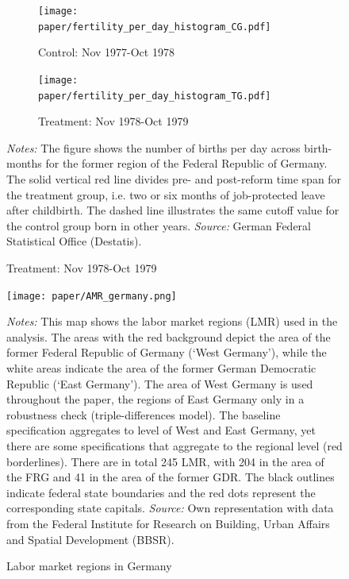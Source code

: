 \documentclass[11pt, a4paper, draft]{article} %
\begin{document}
\begin{landscape}
	\vspace*{\fill}
	\begin{figure}
		[H]\centering
		\caption{Fertility distribution for different years}\label{fig: fertility_hist}
		\begin{subfigure}[h]{0.40\linewidth}\centering
			\caption{Control: Nov 1977-Oct 1978}
			\texttt{[image: paper/fertility\_per\_day\_histogram\_CG.pdf]}
		\end{subfigure}
		\begin{subfigure}[h]{0.40\linewidth}\centering
			\caption{Treatment: Nov 1978-Oct 1979}
			\texttt{[image: paper/fertility\_per\_day\_histogram\_TG.pdf]}
		\end{subfigure}
		\scriptsize
		\begin{minipage}{0.95\linewidth}
			\emph{Notes:} The figure shows the number of births per day across birth-months for the former region of the Federal Republic of Germany. The solid vertical red line divides pre- and post-reform time span for the treatment group, i.e. two or six months of job-protected leave after childbirth. The dashed line illustrates the same cutoff value for the control group born in other years.\newline
			\emph{Source:} German Federal Statistical Office (Destatis).
		\end{minipage}
	\end{figure}
	\vspace*{\fill}\clearpage
\end{landscape}
\vspace*{\fill}
\begin{figure}[H]\centering
	\caption{Labor market regions in Germany}\label{fig: AMR_regions_Germany}
	\texttt{[image: paper/AMR\_germany.png]}
	\scriptsize
	\begin{minipage}{0.9 \linewidth}
		\emph{Notes:} This map shows the labor market regions (LMR) used in the analysis. The areas with the red background depict the area of the former Federal Republic of Germany (`West Germany'), while the white areas indicate the area of the former German Democratic Republic (`East Germany'). The area of West Germany is used throughout the paper, the regions of East Germany only in a robustness check (triple-differences model). The baseline specification aggregates to level of West and East Germany, yet there are some specifications that aggregate to the regional level (red borderlines). There are in total 245 LMR, with 204 in the area of the FRG and 41 in the area of the former GDR. The black outlines indicate federal state boundaries and the red dots represent the corresponding state capitals. \newline \emph{Source:} Own representation with data from the Federal Institute for Research on Building, Urban Affairs and Spatial Development (BBSR).
	\end{minipage}
\end{figure}
\vspace*{\fill}\clearpage
\newpage
\end{document}
